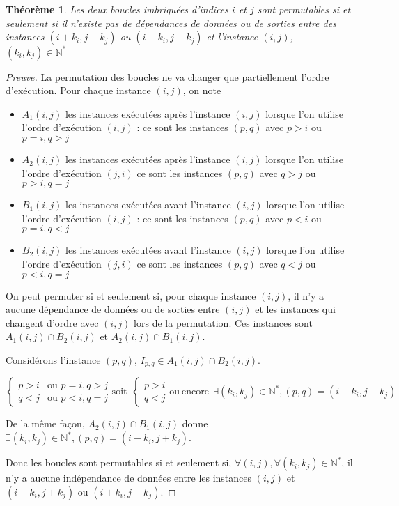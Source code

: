 \documentclass{article}
\newtheorem*{theorem}{Théorème}
\begin{document}
\begin{theorem}
Les deux boucles imbriquées d'indices $i$ et $j$ sont permutables si et seulement si il n'existe pas de dépendances de données ou de sorties entre des instances $(i+k_i, j-k_j)$ ou $(i-k_i, j+k_j)$ et l'instance $(i,j)$, $(k_i, k_j) \in \mathds{N}^*$
\end{theorem}

\begin{proof}[Preuve]
La permutation des boucles ne va changer que partiellement l'ordre d'exécution. Pour chaque instance $(i,j)$, on note
\begin{itemize}
\item $A_{1}(i,j)$ les instances exécutées après l'instance $(i,j)$ lorsque l'on utilise l'ordre d'exécution $(i,j)$ : ce sont les instances $(p,q)$ avec $p>i$ ou $p = i, q >j$
\item $A_{2}(i,j)$ les instances exécutées après l'instance $(i,j)$ lorsque l'on utilise l'ordre d'exécution $(j,i)$ ce sont les instances $(p,q)$ avec $q>j$ ou $p > i, q = j$
\item $B_{1}(i,j)$ les instances exécutées avant l'instance $(i,j)$ lorsque l'on utilise l'ordre d'exécution $(i,j)$ : ce sont les instances $(p,q)$ avec $p<i$ ou $p = i, q <j$
\item $B_{2}(i,j)$ les instances exécutées avant l'instance $(i,j)$ lorsque l'on utilise l'ordre d'exécution $(j,i)$ ce sont les instances $(p,q)$ avec $q<j$ ou $p < i, q = j$
\end{itemize}

On peut permuter si et seulement si, pour chaque instance $(i,j)$, il n'y a aucune dépendance de données ou de sorties entre $(i,j)$ et les instances qui changent d'ordre avec $(i,j)$ lors de la permutation.
Ces instances sont $A_{1}(i,j) \cap B_{2}(i,j)$ et $A_{2}(i,j) \cap B_{1}(i,j)$.

Considérons l'instance $(p,q)$, $I_{p,q} \in A_{1}(i,j) \cap B_{2}(i,j)$.

$$
\left\{
    \begin{array}{ll}
        p > i & \mbox{ou } p = i, q > j \\
        q < j & \mbox{ou } p < i, q = j
    \end{array}
\right.
\mathrm{soit} ~~
\left\{
    \begin{array}{l}
        p > i  \\
        q < j
    \end{array}
\right.
\mathrm{ou~encore} ~~
\exists (k_i, k_j) \in \mathds{N}^*, (p,q) = (i+k_i, j-k_j)
$$

De la même façon, $A_{2}(i,j) \cap B_{1}(i,j)$ donne $\exists (k_i, k_j) \in \mathds{N}^*, (p,q) = (i-k_i, j+k_j)$.

Donc les boucles sont permutables si et seulement si, $\forall (i,j), \forall (k_i, k_j) \in \mathds{N}^*$, il n'y a aucune  indépendance de données entre les instances $(i,j)$ et $(i-k_i, j+k_j)$ ou $(i+k_i, j-k_j)$.

\end{proof}
\end{document}
